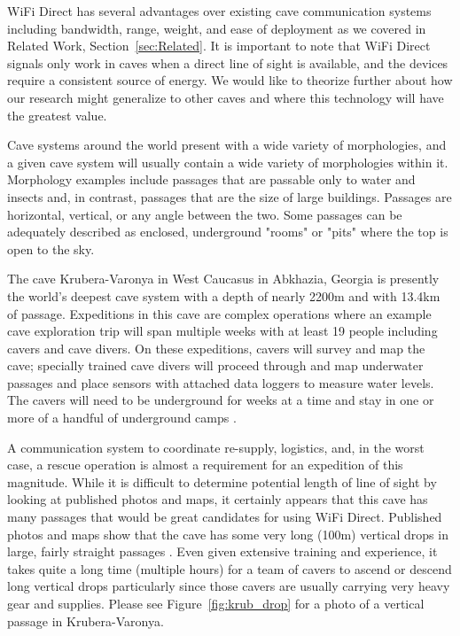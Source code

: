 \documentclass[10pt,twocolumn]{article}
\begin{document}
WiFi Direct has several advantages over existing cave communication systems including bandwidth, range, weight, and ease of deployment as we covered in Related Work, Section~\ref{sec:Related}.
It is important to note that WiFi Direct signals only work in caves when a direct line of sight is available, and the devices require a consistent source of energy.
We would like to theorize further about how our research might generalize to other caves and where this technology will have the greatest value.

Cave systems around the world present with a wide variety of morphologies, and a given cave system will usually contain a wide variety of morphologies within it.
Morphology examples include passages that are passable only to water and insects and, in contrast, passages that are the size of large buildings.
Passages are horizontal, vertical, or any angle between the two.
Some passages can be adequately described as enclosed, underground "rooms" or "pits" where the top is open to the sky.

The cave Krubera-Varonya in West Caucasus in Abkhazia, Georgia is presently the world's deepest cave system with a depth of nearly 2200m and with 13.4km of passage. 
Expeditions in this cave are complex operations where an example cave exploration trip will span multiple weeks with at least 19 people including cavers and cave divers.
On these expeditions, cavers will survey and map the cave; specially trained cave divers will proceed through and map underwater passages and place sensors with attached data loggers to measure water levels.
The cavers will need to be underground for weeks at a time and stay in one or more of a handful of underground camps \cite{krub_it}.

A communication system to coordinate re-supply, logistics, and, in the worst case, a rescue operation is almost a requirement for an expedition of this magnitude.
While it is difficult to determine potential length of line of sight by looking at published photos and maps, 
it certainly appears that this cave has many passages that would be great candidates for using WiFi Direct.
Published photos and maps show that the cave has some very long (100m) vertical drops in large, fairly straight passages 
\cite{krub_it}.
Even given extensive training and experience, it takes quite a long time (multiple hours) for a team of cavers to ascend or descend long vertical drops particularly since those cavers are usually carrying very heavy gear and supplies.
Please see Figure~\ref{fig:krub_drop} for a photo of a vertical passage in Krubera-Varonya.
\end{document}
